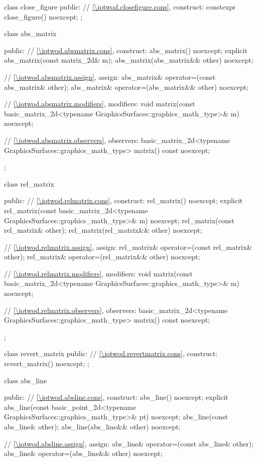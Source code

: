 \begin{codeblock}
{{    class close_figure {
    public:
      // \ref{\iotwod.closefigure.cons}, construct:
      constexpr close_figure() noexcept;
    };

    class abs_matrix {
	public:
      // \ref{\iotwod.absmatrix.cons}, construct:
      abs_matrix() noexcept;
      explicit abs_matrix(const matrix_2d& m);
      abs_matrix(abs_matrix&& other) noexcept;

      // \ref{\iotwod.absmatrix.assign}, assign:
      abs_matrix& operator=(const abs_matrix& other);
      abs_matrix& operator=(abs_matrix&& other) noexcept;
	
      // \ref{\iotwod.absmatrix.modifiers}, modifiers:
      void matrix(const basic_matrix_2d<typename
        GraphicsSurfaces::graphics_math_type>& m) noexcept;
	
      // \ref{\iotwod.absmatrix.observers}, observers:
      basic_matrix_2d<typename GraphicsSurfaces::graphics_math_type> matrix() const noexcept;
    };

    class rel_matrix {
    public:
      // \ref{\iotwod.relmatrix.cons}, construct:
      rel_matrix() noexcept;
      explicit rel_matrix(const basic_matrix_2d<typename
        GraphicsSurfaces::graphics_math_type>& m) noexcept;
      rel_matrix(const rel_matrix& other);
      rel_matrix(rel_matrix&& other) noexcept;

      // \ref{\iotwod.relmatrix.assign}, assign:
      rel_matrix& operator=(const rel_matrix& other);
      rel_matrix& operator=(rel_matrix&& other) noexcept;

      // \ref{\iotwod.relmatrix.modifiers}, modifiers:
      void matrix(const basic_matrix_2d<typename
        GraphicsSurfaces::graphics_math_type>& m) noexcept;
	
      // \ref{\iotwod.relmatrix.observers}, observers:
      basic_matrix_2d<typename GraphicsSurfaces::graphics_math_type> matrix() const noexcept;
    };

    class revert_matrix {
    public:
      // \ref{\iotwod.revertmatrix.cons}, construct:
      revert_matrix() noexcept;
    };

    class abs_line {
    public:
      // \ref{\iotwod.absline.cons}, construct:
      abs_line() noexcept;
      explicit abs_line(const basic_point_2d<typename
        GraphicsSurfaces::graphics_math_type>& pt) noexcept;
      abs_line(const abs_line& other);
      abs_line(abs_line&& other) noexcept;

      // \ref{\iotwod.absline.assign}, assign:
      abs_line& operator=(const abs_line& other);
      abs_line& operator=(abs_line&& other) noexcept;

}}}
\end{codeblock}
